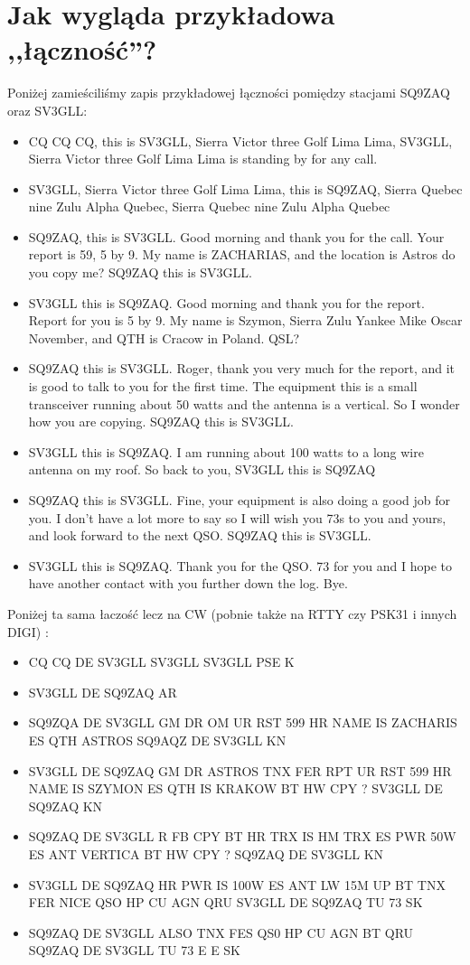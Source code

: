 \documentclass[a4paper,12pt]{article}
\begin{document}
\section{Jak wygląda przykładowa ,,łączność''?}
Poniżej zamieściliśmy zapis przykładowej łączności pomiędzy stacjami SQ9ZAQ oraz SV3GLL:

\begin{itemize}
 \item CQ CQ CQ, this is SV3GLL, Sierra Victor three Golf Lima Lima, SV3GLL, Sierra Victor three Golf Lima Lima is standing by for any call.
 \item SV3GLL, Sierra Victor three Golf Lima Lima, this is SQ9ZAQ, Sierra Quebec nine Zulu Alpha Quebec, Sierra Quebec nine Zulu Alpha Quebec
 \item SQ9ZAQ, this is SV3GLL. Good morning and thank you for the call. Your report is 59, 5 by 9. My name is ZACHARIAS, and the location is Astros do you copy me? SQ9ZAQ this is SV3GLL.
 \item SV3GLL this is SQ9ZAQ. Good morning and thank you for the report. Report for you is 5 by 9. My name is Szymon, Sierra Zulu Yankee Mike Oscar November, and QTH is Cracow in Poland. QSL?
 \item SQ9ZAQ this is SV3GLL. Roger, thank you very much for the report, and it is good to talk to you for the first time. The equipment this is a small transceiver running about 50 watts and the antenna is a vertical. So I wonder how you are copying. SQ9ZAQ this is SV3GLL.
 \item SV3GLL this is SQ9ZAQ. I am running about 100 watts to a long wire antenna on my roof. So back to you, SV3GLL this is SQ9ZAQ
 \item SQ9ZAQ this is SV3GLL. Fine, your equipment is also doing a good job for you. I don't have a lot more to say so I will wish you 73s to you and yours, and look forward to the next QSO. SQ9ZAQ this is SV3GLL.
 \item SV3GLL this is SQ9ZAQ. Thank you for the QSO. 73 for you and I hope to have another contact with you further down the log. Bye.
\end
{itemize}
Poniżej ta sama łaczość lecz na CW (pobnie także na RTTY czy PSK31 i innych DIGI) :
\begin{itemize}
\item CQ CQ DE SV3GLL SV3GLL SV3GLL PSE K
\item SV3GLL DE SQ9ZAQ AR
\item SQ9ZQA DE SV3GLL GM DR OM UR RST 599 HR NAME IS ZACHARIS ES QTH ASTROS SQ9AQZ DE SV3GLL KN
\item SV3GLL DE SQ9ZAQ GM DR ASTROS TNX FER RPT UR RST 599 HR NAME IS SZYMON ES QTH IS KRAKOW BT HW CPY ? SV3GLL DE SQ9ZAQ KN
 \item SQ9ZAQ DE SV3GLL R FB CPY BT HR TRX IS HM TRX ES PWR 50W ES ANT VERTICA BT HW CPY ? SQ9ZAQ DE SV3GLL KN 
 \item SV3GLL DE SQ9ZAQ HR PWR IS 100W ES ANT LW 15M UP BT TNX FER NICE QSO HP CU AGN QRU SV3GLL DE SQ9ZAQ TU 73 SK
 \item SQ9ZAQ DE SV3GLL ALSO TNX FES QS0 HP CU AGN BT QRU SQ9ZAQ DE SV3GLL TU 73 E E SK
\end{itemize}
\end{document}
